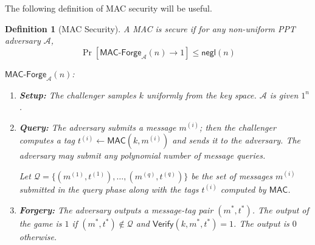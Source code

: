 \documentclass[11pt]{article}
\newtheorem{definition}[theorem]{Definition}
\newenvironment{solution}{\color{blue}\noindent{\bf Solution}\hspace*{1em}}{\qed\medskip}
\newcommand{\qed}{\mbox{}\hspace*{\fill}\nolinebreak\mbox{$\rule{0.6em}{0.6em}$}} %
\numberwithin{equation}{section}
\newcommand{\Verify}{\mathsf{Verify}}
\newcommand{\MAC}{\mathsf{MAC}}
\newcommand{\cA}{\mathcal{A}}
\newcommand{\cQ}{\mathcal{Q}}
\newcommand{\negl}{\mathsf{negl}}
\newif\ifsol
\begin{document}
\noindent The following definition of MAC security will be useful.
\begin{definition}[MAC Security]
A MAC is secure if for any non-uniform PPT adversary $\cA$, 
\[\Pr[\mathsf{MAC}\text{-}\mathsf{Forge}_{\cA}(n) \to 1] \leq \negl(n)\]

\noindent\underline{$\mathsf{MAC}\text{-}\mathsf{Forge}_{\cA}(n)$}:
    \begin{enumerate}
        \item \textbf{Setup:} The challenger samples $k$ uniformly from the key space. $\cA$ is given $1^n$.
        \item \textbf{Query:} The adversary submits a message $m^{(i)}$; then the challenger computes a tag $t^{(i)} \gets \MAC(k, m^{(i)})$ and sends it to the adversary. The adversary may submit any polynomial number of message queries.
        
        Let $\cQ = \{(m^{(1)}, t^{(1)}), \dots, (m^{(q)}, t^{(q)})\}$ be the set of messages $m^{(i)}$ submitted in the query phase along with the tags $t^{(i)}$ computed by $\MAC$.
        \item \textbf{Forgery:} The adversary outputs a message-tag pair $(m^*, t^*)$. The output of the game is $1$ if $(m^*,t^*) \notin \cQ$ and $\Verify(k, m^*, t^*) = 1$. The output is $0$ otherwise.
    \end{enumerate}
\end{definition}


\ifsol
\pagebreak
\begin{solution}
TBD    
\end{solution}
\fi
\end{document}
